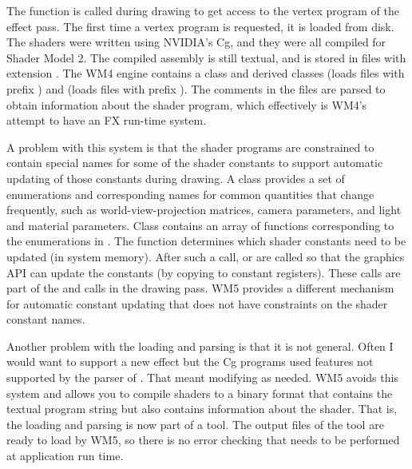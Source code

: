 \documentclass{article}
\begin{document}
The function  is called during drawing to
get access to the vertex program of the effect pass.  The first time a
vertex program is requested, it is loaded from disk.  The shaders were
written using NVIDIA's Cg, and they were all compiled for Shader Model 2.
The compiled assembly is still textual, and is stored in files with
extension .  The WM4 engine contains a class 
and derived classes  (loads  files with
prefix ) and  (loads  files with
prefix ).  The comments in the  files are parsed
to obtain information about the shader program, which effectively is
WM4's attempt to have an FX run-time system.

A problem with this system is that the shader programs are constrained
to contain special names for some of the shader constants to support
automatic updating of those constants during drawing.  A class
 provides a set of enumerations and corresponding
names for common quantities that change frequently, such as
world-view-projection matrices, camera parameters, and light and
material parameters.  Class  contains an array of functions
corresponding to the enumerations in .  The
function  determines which shader
constants need to be updated (in system memory).  After such a call,
 or 
are called so that the graphics API can update the constants (by copying
to constant registers).  These  calls are part of the
 and  calls
in the drawing pass.  WM5 provides a different mechanism for automatic
constant updating that does not have constraints on the shader constant
names.

Another problem with the  loading and parsing is that it
is not general.  Often I would want to support a new effect but the
Cg programs used features not supported by the parser of
.  That meant modifying  as needed.  WM5
avoids this system and allows you to compile shaders to a binary format
that contains the textual program string but also contains information
about the shader.  That is, the loading and parsing is now part of a
tool.  The output files of the tool are ready to load by WM5, so there
is no error checking that needs to be performed at application run time.
\end{document}
